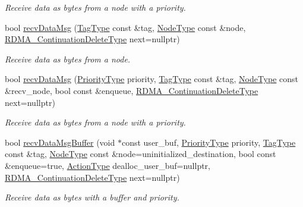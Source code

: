 \begin{DoxyCompactItemize}
\begin{DoxyCompactList}\small\item\em Receive data as bytes from a node with a priority. \end{DoxyCompactList}\item 
bool \hyperlink{structvt_1_1messaging_1_1_active_messenger_a33b2e3e047d0b1f6eb1398691f075b31}{recv\+Data\+Msg} (\hyperlink{namespacevt_a84ab281dae04a52a4b243d6bf62d0e52}{Tag\+Type} const \&tag, \hyperlink{namespacevt_a866da9d0efc19c0a1ce79e9e492f47e2}{Node\+Type} const \&node, \hyperlink{namespacevt_a4dfad0b5809d9812d60a0311a45ae0c2}{R\+D\+M\+A\+\_\+\+Continuation\+Delete\+Type} next=nullptr)
\begin{DoxyCompactList}\small\item\em Receive data as bytes from a node. \end{DoxyCompactList}\item 
bool \hyperlink{structvt_1_1messaging_1_1_active_messenger_a3ef2c45eb57382a2d76079ca8da9d527}{recv\+Data\+Msg} (\hyperlink{namespacevt_a86bff9f556eb761b27fc8600d006ac04}{Priority\+Type} priority, \hyperlink{namespacevt_a84ab281dae04a52a4b243d6bf62d0e52}{Tag\+Type} const \&tag, \hyperlink{namespacevt_a866da9d0efc19c0a1ce79e9e492f47e2}{Node\+Type} const \&recv\+\_\+node, bool const \&enqueue, \hyperlink{namespacevt_a4dfad0b5809d9812d60a0311a45ae0c2}{R\+D\+M\+A\+\_\+\+Continuation\+Delete\+Type} next=nullptr)
\begin{DoxyCompactList}\small\item\em Receive data as bytes from a node with a priority. \end{DoxyCompactList}\item 
bool \hyperlink{structvt_1_1messaging_1_1_active_messenger_a9d62cd073f5b7dc1861dd1fa7b80ca01}{recv\+Data\+Msg\+Buffer} (void $\ast$const user\+\_\+buf, \hyperlink{namespacevt_a86bff9f556eb761b27fc8600d006ac04}{Priority\+Type} priority, \hyperlink{namespacevt_a84ab281dae04a52a4b243d6bf62d0e52}{Tag\+Type} const \&tag, \hyperlink{namespacevt_a866da9d0efc19c0a1ce79e9e492f47e2}{Node\+Type} const \&node=uninitialized\+\_\+destination, bool const \&enqueue=true, \hyperlink{namespacevt_ae0a5a7b18cc99d7b732cb4d44f46b0f3}{Action\+Type} dealloc\+\_\+user\+\_\+buf=nullptr, \hyperlink{namespacevt_a4dfad0b5809d9812d60a0311a45ae0c2}{R\+D\+M\+A\+\_\+\+Continuation\+Delete\+Type} next=nullptr)
\begin{DoxyCompactList}\small\item\em Receive data as bytes with a buffer and priority. \end{DoxyCompactList}\item 

\end{DoxyCompactItemize}
